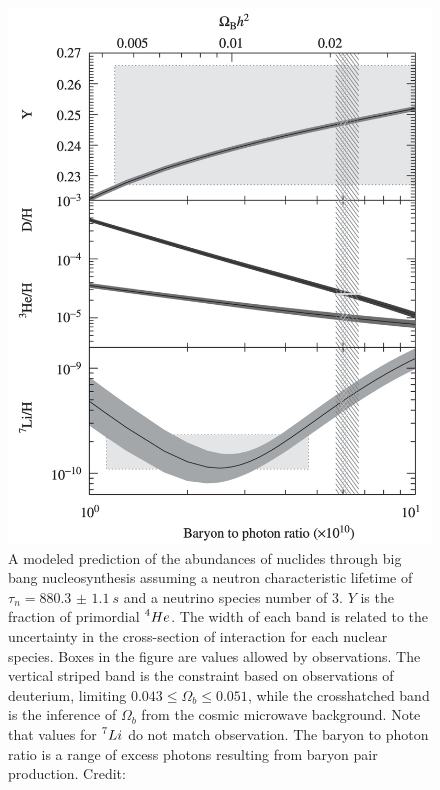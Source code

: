 \documentclass{paper}
\begin{document}
  \begin{figure}[H]
    \begin{centering}
    \includegraphics[scale=0.5]{BBN-ratios.pdf}
    \caption{A modeled prediction of the abundances of nuclides through big
      bang nucleosynthesis assuming a neutron characteristic lifetime of
      \(\tau_n = \SI{880.3(11)}{s}\) and a neutrino species number of 3. 
      \(Y\) is the fraction of primordial \(\prescript{4}{}{He}\). The width 
      of each band is related to the uncertainty in the cross-section of 
      interaction for each nuclear species. Boxes in the figure are values 
      allowed by observations. The vertical striped band is the constraint 
      based on observations of deuterium, limiting 
      \(0.043 \leq \Omega_b \leq 0.051\), while the crosshatched band 
      is the inference of \(\Omega_b\) from the cosmic microwave 
      background.  Note that values for \(\prescript{7}{}{Li}\) do not match 
      observation. The baryon to photon ratio is a range of excess photons
      resulting from baryon pair production.
      Credit: \cite{liddle2015introduction}}
    \label{fig:BBN-ratios}
    \end{centering}
  \end{figure}
\end{document}
